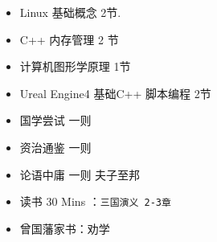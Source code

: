 \documentclass[UTF8,a4paper,8pt]{ctexart}
\begin{document}
	 	 \begin{itemize}[itemindent = 1em]
	 	 	\renewcommand\labelitemi{\makebox[0pt][l]{$\square$}\raisebox{.15ex}{\hspace{0.1em}$\checkmark$}}	
	 	 	\item   Linux 基础概念 2节.
	 	 	
	 	 	\item    C++ 内存管理 2 节
	 	 	
	 	 	
	 	 	
	 	 	
	 	 	
	 	 	
	 	 	
	 	 	
	 	 	
	 	 	\item   计算机图形学原理 1节
	 	 	\item   Ureal Engine4 基础C++ 脚本编程 2节
	 	 	
	 	 	
	 	 	\renewcommand\labelitemi{\makebox[0pt][l]{$\square$}\hspace{1em}}
	 	 	\item    国学尝试 一则
	 	 	\item 	 资治通鉴 一则 
	 	 	\item  	 论语中庸 一则 夫子至邦
	 	 	\item    读书  30 Mins	：\verb|三国演义 2-3章|
	 	 	\item    曾国藩家书：劝学
	 	 \end{itemize}
\end{document}
